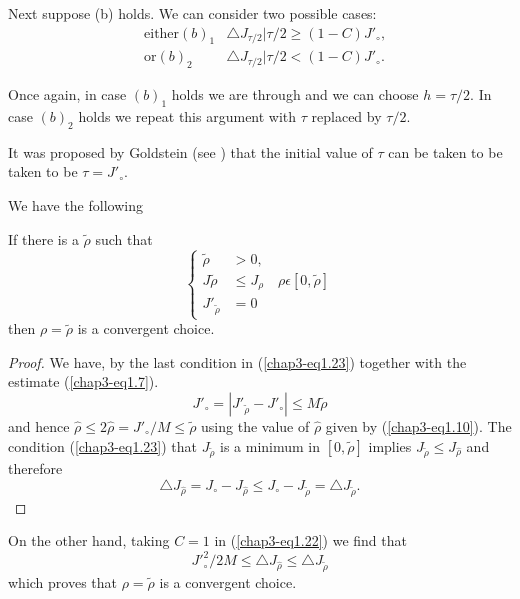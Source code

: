 Next suppose (b) holds. We can consider two possible cases:
\begin{align*}
 & \text{either}  (b)_{1}   & \triangle J_{\tau /2} | \tau / 2 \geq (1-C){J'}_{\circ},\\
& \text{or}   (b)_{2}  & \triangle J_{\tau / 2} | \tau / 2 < (1-C){J'}_{\circ}.
\end{align*}

Once again, in case $(b)_{1}$ holds we are through and we can choose $h = \tau/2$. In case $(b)_{2}$ holds we repeat this argument with $\tau$ replaced by $\tau/2$.

\setcounter{remark}{1}
\begin{remark}%
It was proposed by Goldstein (see \cite{key21}) that the initial value of $\tau$ can be taken to be taken to be $\tau = {J'}_{\circ}$.
\end{remark}

\medskip
{} We have the following

\begin{proposition}\label{chap3-prop1.7}
If there is a $\widetilde{\rho}$ such that
\begin{equation*}
\begin{cases}
\widetilde{\rho} & > 0,\\
J\widetilde{\rho} & \leq J_{\rho} \quad \rho \epsilon [0, \widetilde{\rho}]\\
{J'}_{\widetilde{\rho}} & = 0\tag{1.23}\label{chap3-eq1.23}
\end{cases}
\end{equation*}
then $\rho = \widetilde{\rho}$ is a convergent choice.
\end{proposition}

\begin{proof}
We have, by the last condition in (\ref{chap3-eq1.23}) together with the estimate (\ref{chap3-eq1.7}).
$$
{J'}_{\circ} = |{J'}_{\widetilde{\rho}} - {J'}_{\circ}| \leq M \widetilde{\rho}
$$
and hence $\hat{\rho} \leq 2\hat{\rho} = {J'}_{\circ} / M \leq \widetilde{\rho}$ using the value of $\hat{\rho}$ given by (\ref{chap3-eq1.10}). The condition (\ref{chap3-eq1.23}) that $J_{\widetilde{\rho}}$ is a minimum in $[0, \widetilde{\rho}]$ implies $J_{\widetilde{\rho}} \leq J_{\hat{\rho}}$ and therefore
$$
\triangle J_{\hat{\rho}} = J_{\circ} - J_{\hat{\rho}} \leq J_{\circ} - J_{\widetilde{\rho}} = \triangle J_{\widetilde{\rho}}.
$$
\end{proof}

On the other hand, taking $C = 1$ in (\ref{chap3-eq1.22}) we find that
\begin{equation*}
{J'}_{\circ}^{2} / 2M \leq \triangle J_{\hat{\rho}} \leq \triangle J_{\widetilde{\rho}}\tag{1.24}\label{chap3-eq1.24}
\end{equation*}
which proves that $\rho = \widetilde{\rho}$ is a convergent choice.


